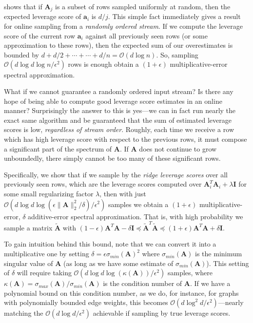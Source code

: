 \documentclass{toc}
\newcommand{\Oh}{\ensuremath{\mathcal{O}}}
\newcommand{\bv}[1]{\mathbf{#1}}
\newcommand{\norm}[1]{\|#1\|}
\begin{document}
\cite{cohen2015uniform} shows that
if $\bv{A}_j$ is a subset of rows sampled uniformly at random, then the expected leverage score of $\bv{a}_i$ is $d/j$. This simple fact immediately gives a result for online sampling from a \emph{randomly ordered stream}.
If we compute the leverage score of the current row $\bv{a}_i$ against all previously seen rows (or some approximation to these rows), then the expected sum of our overestimates is bounded by $d + d/2 + \cdots + \cdots + d/n = \Oh(d \log n)$. So, sampling $\Oh(d\log d \log n /\epsilon^2)$ rows is enough obtain a $(1+\epsilon)$ multiplicative-error spectral approximation.

What if we cannot guarantee a randomly ordered input stream? Is there any hope of being able to compute good leverage score estimates in an online manner? Surprisingly the answer to this is yes---we can in fact run nearly the exact same algorithm and be guaranteed that the sum of estimated leverage scores is low, \emph{regardless of stream order}. Roughly, each time we receive a row which has high leverage score with respect to the previous rows, it must compose a significant part of the spectrum  of $\bv{A}$. If $\bv{A}$ does not continue to grow unboundedly, there simply cannot be too many of these significant rows.

Specifically, we show that if we sample by the \emph{ridge leverage scores} \cite{alaoui2014fast} over all previously seen rows, which are the leverage scores computed over $\bv{A}_i^T \bv{A}_i + \lambda \bv I$ for some small regularizing factor $\lambda$, then with just $\Oh(d \log d \log (\epsilon\norm{\bv A}_2^2/\delta) / \epsilon^2)$ samples we obtain a $(1+\epsilon)$ multiplicative-error, $\delta$ additive-error spectral approximation. That is, with high probability we sample a matrix $\bv{\tilde A}$ with $(1-\epsilon)\bv{A}^T\bv{A} - \delta\bv{I} \preceq \bv{\tilde{A}}^T\bv{\tilde{A}} \preceq (1+\epsilon)\bv{A}^T\bv{A} + \delta\bv{I}$.

To gain intuition behind this bound, note that we can convert it into a multiplicative one by setting $\delta = \epsilon \sigma_{min}(\bv{A})^2$ where $\sigma_{min}(\bv{A})$ is the minimum singular value of $\bv{A}$ (as long as we have some estimate of $\sigma_{min}(\bv{A})$). This setting of $\delta$ will require taking $\Oh(d \log d \log (\kappa(\bv A)) / \epsilon^2)$ samples, where $\kappa(\bv{A}) = \sigma_{max}(\bv{A})/\sigma_{min}(\bv{A})$ is the condition number of $\bv{A}$. If we have a polynomial bound on this condition number, as we do, for instance, for graphs with polynomially bounded
%
edge    %
weights, this becomes $\Oh(d \log^2 d / \epsilon^2)$---nearly matching the  $\Oh(d \log d / \epsilon^2)$ achievable if sampling by true leverage scores.
\end{document}

